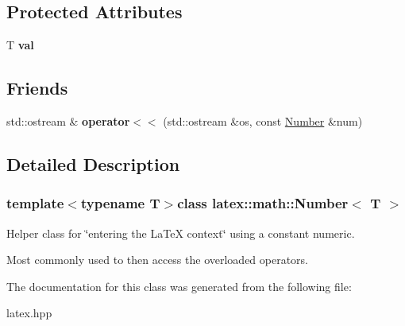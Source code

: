 \subsection*{Protected Attributes}
\begin{DoxyCompactItemize}
\item 
\hypertarget{classlatex_1_1math_1_1Number_a7a761cdf214f2d5752808ddaf651d2b7}{T {\bfseries val}}\label{classlatex_1_1math_1_1Number_a7a761cdf214f2d5752808ddaf651d2b7}

\end{DoxyCompactItemize}
\subsection*{Friends}
\begin{DoxyCompactItemize}
\item 
\hypertarget{classlatex_1_1math_1_1Number_aa6d72faef992d5b025e38cfbaad05ee4}{std\-::ostream \& {\bfseries operator$<$$<$} (std\-::ostream \&os, const \hyperlink{classlatex_1_1math_1_1Number}{Number} \&num)}\label{classlatex_1_1math_1_1Number_aa6d72faef992d5b025e38cfbaad05ee4}

\end{DoxyCompactItemize}


\subsection{Detailed Description}
\subsubsection*{template$<$typename T$>$class latex\-::math\-::\-Number$<$ T $>$}

Helper class for \char`\"{}entering the La\-Te\-X context\char`\"{} using a constant numeric.

Most commonly used to then access the overloaded operators. 

The documentation for this class was generated from the following file\-:\begin{DoxyCompactItemize}
\item 
latex.\-hpp\end{DoxyCompactItemize}
